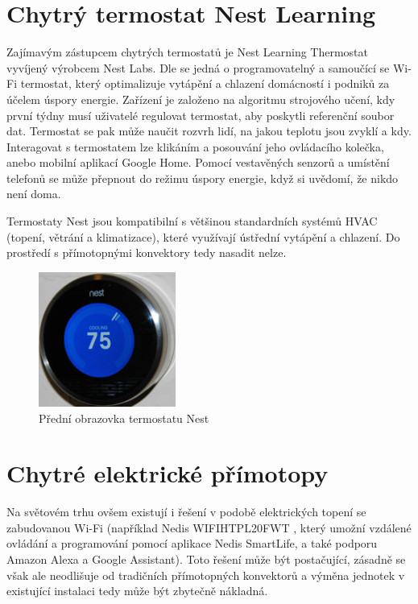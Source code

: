 \section{Chytrý termostat Nest Learning}
Zajímavým zástupcem chytrých termostatů je Nest Learning Thermostat vyvíjený výrobcem Nest Labs. Dle \cite{nest} se jedná o programovatelný a samoučící se Wi-Fi termostat, který optimalizuje vytápění a chlazení domácností i podniků za účelem úspory energie. Zařízení je založeno na algoritmu strojového učení, kdy první týdny musí uživatelé regulovat termostat, aby poskytli referenční soubor dat. Termostat se pak může naučit rozvrh lidí, na jakou teplotu jsou zvyklí a kdy. Interagovat s termostatem lze klikáním a posouvání jeho ovládacího kolečka, anebo mobilní aplikací Google Home. Pomocí vestavěných senzorů a umístění telefonů se může přepnout do režimu úspory energie, když si uvědomí, že nikdo není doma.

Termostaty Nest jsou kompatibilní s většinou standardních systémů HVAC (topení, větrání a klimatizace), které využívají ústřední vytápění a chlazení. Do prostředí s přímotopnými konvektory tedy nasadit nelze.

\begin{figure}[hbt]
\centering
\includegraphics[width=0.4\textwidth]{obrazky-figures/nest.png}
\caption{Přední obrazovka termostatu Nest}
\end{figure}

\pagebreak

\section{Chytré elektrické přímotopy}
Na světovém trhu ovšem existují i řešení v podobě elektrických topení se zabudovanou Wi-Fi (například Nedis WIFIHTPL20FWT \cite{nedis}, který umožní vzdálené ovládání a programování pomocí aplikace Nedis SmartLife, a také podporu Amazon Alexa a Google Assistant). Toto řešení může být postačující, zásadně se však ale neodlišuje od tradičních přímotopných konvektorů a výměna jednotek v existující instalaci tedy může být zbytečně nákladná.

